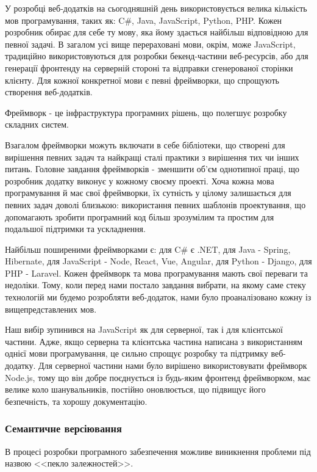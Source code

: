 У розробці веб-додатків на сьогодняшній день використовується велика кількість мов програмування, таких як: C\#, Java, JavaScript, Python, PHP. Кожен розробник обирає для себе ту мову, яка йому здається найбільш відповідною для певної задачі. В загалом усі вище перераховані мови, окрім, може JavaScript, традиційно використовуються для розробки бекенд-частини веб-ресурсів, або для генерації фронтенду на серверній стороні та відправки сгенерованої сторінки клієнту. Для кожної конкретної мови є певні фреймворки, що спрощують створення веб-додатків.

Фреймворк - це інфраструктура програмних рішень, що полегшує розробку складних систем.

Взагалом фреймворки можуть включати в себе бібліотеки, що створені для вирішення певних задач та найкращі сталі практики з вирішення тих чи інших питань. Головне завдання фреймворків - зменшити об'єм однотипної праці, що розробник додатку виконує у кожному своєму проекті. Хоча кожна мова програмування й має свої фреймворки, їх сутність у цілому залишається для певних задач доволі близькою: використання певних шаблонів проектування, що допомагають зробити програмний код більш зрозумілим та простим для подальшої підтримки та ускладнення.

Найбільш поширеними фреймворками є: для C\# є .NET, для Java - Spring, Hibernate, для JavaScript - Node, React, Vue, Angular, для Python - Django, для PHP - Laravel. Кожен фреймворк та мова програмування мають свої переваги та недоліки. Тому, коли перед нами постало завдання вибрати, на якому саме стеку технологій ми будемо розробляти веб-додаток, нами було проаналізовано кожну із вищепредставлених мов.

Наш вибір зупинився на JavaScript як для серверної, так і для клієнтської частини. Адже, якщо серверна та клієнтська частина написана з використанням однієї мови програмування, це сильно спрощує розробку та підтримку веб-додатку. Для серверної частини нами було вирішено використовувати фреймворк Node.js, тому що він добре поєднується із будь-яким фронтенд фреймворком, має велике коло шанувальників, постійно оновлюється, що підвищує його безпечність, та хорошу документацію.  

\subsubsection{Семантичне версіювання} \label{subs:semver}

В процесі розробки програмного забезпечення можливе виникнення проблеми під назвою <<пекло залежностей>>. 

